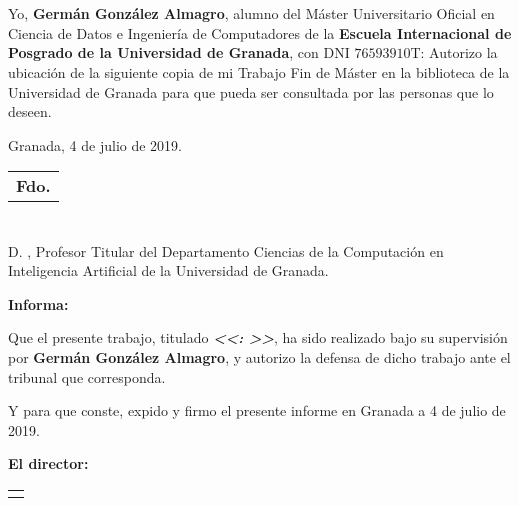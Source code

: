 \chapter*{}
\thispagestyle{empty}


Yo, \textbf{Germán González Almagro}, alumno del Máster Universitario Oficial en Ciencia de Datos e Ingeniería de Computadores de la \textbf{Escuela Internacional de Posgrado de la Universidad de Granada}, con DNI $\mathrm{76593910}$T: Autorizo la
ubicación de la siguiente copia de mi Trabajo Fin de Máster en la biblioteca de la Universidad de Granada para que pueda ser
consultada por las personas que lo deseen.

\vspace{0.1cm}

\begin{flushleft}
	Granada, 4 de julio de 2019.
\end{flushleft}

\vspace{2.5cm}

\begin{flushright}
	
	\begin{tabular}{m{6cm}}
		\\ \hline
		\centering\textbf{Fdo. \myName} \\
	\end{tabular}
	
\end{flushright}


\chapter*{}
\thispagestyle{empty}


D. \textbf{\myProf}, Profesor Titular del Departamento Ciencias de la Computación en Inteligencia Artificial de la Universidad de Granada.

\vspace{0.5cm}

\textbf{Informa:}

\vspace{0.5cm}

Que el presente trabajo, titulado \textit{\textbf{<<\myTitle: \mySubtitle>>}},
ha sido realizado bajo su supervisión por \textbf{Germán González Almagro}, y autorizo la defensa de dicho trabajo ante el tribunal
que corresponda.

\vspace{0.5cm}

Y para que conste, expido y firmo el presente informe en Granada a 4 de julio de 2019.

\vspace{1cm}

\textbf{El director:}

\vspace{4cm}


\begin{table}
		\flushright
		\begin{tabular}{c}
			\\ \hline 
			\textbf{\myProf}\\
		\end{tabular}
\end{table}